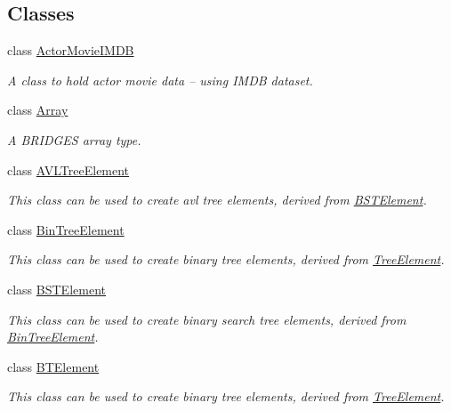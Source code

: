 \subsection*{Classes}
\begin{DoxyCompactItemize}
\item 
class \hyperlink{classbridges_1_1_actor_movie_i_m_d_b}{Actor\+Movie\+I\+M\+D\+B}
\begin{DoxyCompactList}\small\item\em A class to hold actor movie data -- using I\+M\+D\+B dataset. \end{DoxyCompactList}\item 
class \hyperlink{classbridges_1_1_array}{Array}
\begin{DoxyCompactList}\small\item\em A B\+R\+I\+D\+G\+E\+S array type. \end{DoxyCompactList}\item 
class \hyperlink{classbridges_1_1_a_v_l_tree_element}{A\+V\+L\+Tree\+Element}
\begin{DoxyCompactList}\small\item\em This class can be used to create avl tree elements, derived from \hyperlink{classbridges_1_1_b_s_t_element}{B\+S\+T\+Element}. \end{DoxyCompactList}\item 
class \hyperlink{classbridges_1_1_bin_tree_element}{Bin\+Tree\+Element}
\begin{DoxyCompactList}\small\item\em This class can be used to create binary tree elements, derived from \hyperlink{classbridges_1_1_tree_element}{Tree\+Element}. \end{DoxyCompactList}\item 
class \hyperlink{classbridges_1_1_b_s_t_element}{B\+S\+T\+Element}
\begin{DoxyCompactList}\small\item\em This class can be used to create binary search tree elements, derived from \hyperlink{classbridges_1_1_bin_tree_element}{Bin\+Tree\+Element}. \end{DoxyCompactList}\item 
class \hyperlink{classbridges_1_1_b_t_element}{B\+T\+Element}
\begin{DoxyCompactList}\small\item\em This class can be used to create binary tree elements, derived from \hyperlink{classbridges_1_1_tree_element}{Tree\+Element}. \end{DoxyCompactList}\item 

\end{DoxyCompactItemize}

